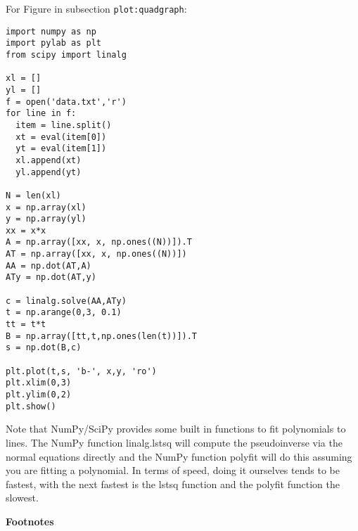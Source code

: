 For Figure in subsection \texttt{plot:quadgraph}:

\begin{verbatim}
import numpy as np
import pylab as plt
from scipy import linalg

xl = []
yl = []
f = open('data.txt','r')
for line in f:
  item = line.split()
  xt = eval(item[0])
  yt = eval(item[1])
  xl.append(xt)
  yl.append(yt)

N = len(xl)
x = np.array(xl)
y = np.array(yl)
xx = x*x
A = np.array([xx, x, np.ones((N))]).T
AT = np.array([xx, x, np.ones((N))])
AA = np.dot(AT,A)
ATy = np.dot(AT,y)

c = linalg.solve(AA,ATy)
t = np.arange(0,3, 0.1)
tt = t*t
B = np.array([tt,t,np.ones(len(t))]).T
s = np.dot(B,c)

plt.plot(t,s, 'b-', x,y, 'ro')
plt.xlim(0,3)
plt.ylim(0,2)
plt.show()
\end{verbatim}

Note that NumPy/SciPy provides some built in functions to fit
polynomials to lines. The NumPy function linalg.lstsq will compute the
pseudoinverse via the normal equations directly and the NumPy function
polyfit will do this assuming you are fitting a polynomial. In terms of
speed, doing it ourselves tends to be fastest, with the next fastest is
the lstsq function and the polyfit function the slowest.

\textbf{Footnotes}
